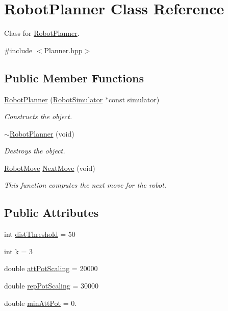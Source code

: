 \hypertarget{classRobotPlanner}{\section{Robot\-Planner Class Reference}
\label{classRobotPlanner}
}


Class for \hyperlink{classRobotPlanner}{Robot\-Planner}.  




{\ttfamily \#include $<$Planner.\-hpp$>$}

\subsection*{Public Member Functions}
\begin{DoxyCompactItemize}
\item 
\hyperlink{classRobotPlanner_a0388bc0950f92bd593a2a274c713bc35}{Robot\-Planner} (\hyperlink{classRobotSimulator}{Robot\-Simulator} $\ast$const simulator)
\begin{DoxyCompactList}\small\item\em Constructs the object. \end{DoxyCompactList}\item 
\hyperlink{classRobotPlanner_a8dfdfeb05b468c1427a3157c6467d2cd}{$\sim$\-Robot\-Planner} (void)
\begin{DoxyCompactList}\small\item\em Destroys the object. \end{DoxyCompactList}\item 
\hyperlink{structRobotMove}{Robot\-Move} \hyperlink{classRobotPlanner_a6540d24f5f096465009b18b42320bd1f}{Next\-Move} (void)
\begin{DoxyCompactList}\small\item\em This function computes the next move for the robot. \end{DoxyCompactList}\end{DoxyCompactItemize}
\subsection*{Public Attributes}
\begin{DoxyCompactItemize}
\item 
int \hyperlink{classRobotPlanner_aa7d1571a5f12412daa58d79c518c946c}{dist\-Threshold} = 50
\item 
int \hyperlink{classRobotPlanner_a18ebcf4ba23a817db1a2fda878120eb4}{k} = 3
\item 
double \hyperlink{classRobotPlanner_aa68f0bb24256b470a8a4d13d858aef7f}{att\-Pot\-Scaling} = 20000
\item 
double \hyperlink{classRobotPlanner_a0b056d74826bddeb6dbd5a458aad0758}{rep\-Pot\-Scaling} = 30000
\item 
double \hyperlink{classRobotPlanner_a199d479764e8e96c37654486ddc1ef7d}{min\-Att\-Pot} = 0.
\end{DoxyCompactItemize}


